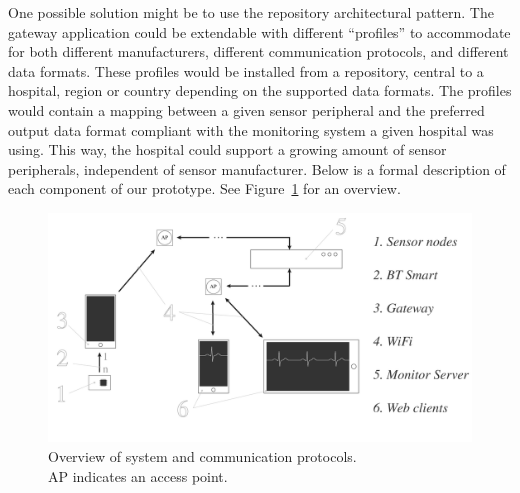 One possible solution might be to use the repository architectural pattern. The gateway application could be extendable with different ``profiles'' to accommodate for both different manufacturers,  different communication protocols, and different data formats. These profiles would be installed from a repository, central to a hospital, region or country depending on the supported data formats. The profiles would contain a mapping between a given sensor peripheral and the preferred output data format compliant with the monitoring system a given hospital was using. This way, the hospital could support a growing amount of sensor peripherals, independent of sensor manufacturer. Below is a formal description of each component of our prototype. See Figure~\ref{fig:architecture2} for an overview.

\begin{figure}[H]
\centering
\includegraphics[scale=0.35]{img/figures/architecture2.png}
\captionsetup{justification=centering}
\caption{Overview of system and communication protocols.\\ AP indicates an access point.}
\label{fig:architecture2}
\end{figure}


